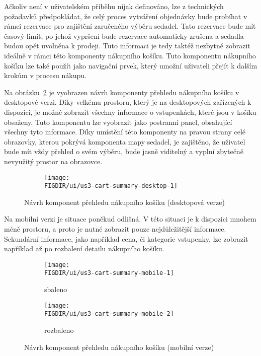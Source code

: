 Ačkoliv není v uživatelském příběhu nijak definováno, lze z technických požadavků předpokládat, že celý proces vytváření objednávky bude probíhat v rámci rezervace pro zajištění zaručeného výběru sedadel.
Tato rezervace bude mít časový limit, po jehož vypršení bude rezervace automaticky zrušena a sedadla budou opět uvolněna k prodeji.
Tuto informaci je tedy taktéž nezbytné zobrazit ideálně v rámci této komponenty nákupního košíku.
Tuto komponentu nákupního košíku lze také použít jako navigační prvek, který umožní uživateli přejít k dalším krokům v procesu nákupu.

Na obrázku~\ref{fig:us3-cart-summary-desktop} je vyobrazen návrh komponenty přehledu nákupního košíku v desktopové verzi.
Díky velkému prostoru, který je na desktopových zařízených k dispozici, je možné zobrazit všechny informace o vstupenkách, které jsou v košíku obsaženy.
Tuto komponentu lze vyobrazit jako postranní panel, obsahující všechny tyto informace.
Díky umístění této komponenty na pravou strany celé obrazovky, kterou pokrývá komponenta mapy sedadel, je zajištěno, že uživatel bude mít vždy přehled o svém výběru, bude jasně viditelný a vyplní zbytečně nevyužitý prostor na obrazovce.

\begin{figure}[H]
    \centering
    \begin{subfigure}{\textwidth}
        \texttt{[image: \\FIGDIR/ui/us3-cart-summary-desktop-1]}
        \label{fig:uus3-cart-summary-desktop-1}
    \end{subfigure}
    \caption{Návrh komponent přehledu nákupního košíku (desktopová verze)}
    \label{fig:us3-cart-summary-desktop}
\end{figure}

Na mobilní verzi je situace poněkud odlišná.
V této situaci je k dispozici mnohem méně prostoru, a proto je nutné zobrazit pouze nejdůležitější informace.
Sekundární informace, jako například cena, či kategorie vstupenky, lze zobrazit například až po rozbalení detailu nákupního košíku.

\begin{figure}[H]
    \centering
    \begin{subfigure}{0.4\textwidth}
        \texttt{[image: \\FIGDIR/ui/us3-cart-summary-mobile-1]}
        \caption{sbaleno}
        \label{fig:us3-cart-summary-mobile-1}
    \end{subfigure}
    \hfill
    \begin{subfigure}{0.4\textwidth}
        \texttt{[image: \\FIGDIR/ui/us3-cart-summary-mobile-2]}
        \caption{rozbaleno}
        \label{fig:us3-cart-summary-mobile-2}
    \end{subfigure}

    \caption{Návrh komponent přehledu nákupního košíku (mobilní verze)}
    \label{fig:us3-cart-summary-mobile}
\end{figure}

